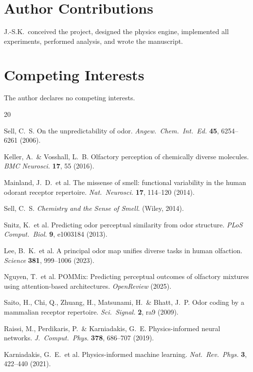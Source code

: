 \documentclass[11pt,a4paper]{article}
\begin{document}
\section*{Author Contributions}
J.-S.K.\ conceived the project, designed the physics engine, implemented all experiments, performed analysis, and wrote the manuscript.

\section*{Competing Interests}
The author declares no competing interests.

\begin{thebibliography}{20}

 Sell, C.\ S. On the unpredictability of odor. \emph{Angew.\ Chem.\ Int.\ Ed.} \textbf{45}, 6254--6261 (2006).

 Keller, A.\ \& Vosshall, L.\ B. Olfactory perception of chemically diverse molecules. \emph{BMC Neurosci.} \textbf{17}, 55 (2016).

 Mainland, J.\ D.\ et al. The missense of smell: functional variability in the human odorant receptor repertoire. \emph{Nat.\ Neurosci.} \textbf{17}, 114--120 (2014).

 Sell, C.\ S. \emph{Chemistry and the Sense of Smell}. (Wiley, 2014).

 Snitz, K.\ et al. Predicting odor perceptual similarity from odor structure. \emph{PLoS Comput.\ Biol.} \textbf{9}, e1003184 (2013).

 Lee, B.\ K.\ et al. A principal odor map unifies diverse tasks in human olfaction. \emph{Science} \textbf{381}, 999--1006 (2023).

 Nguyen, T.\ et al. POMMix: Predicting perceptual outcomes of olfactory mixtures using attention-based architectures. \emph{OpenReview} (2025).

 Saito, H., Chi, Q., Zhuang, H., Matsunami, H.\ \& Bhatt, J.\ P. Odor coding by a mammalian receptor repertoire. \emph{Sci.\ Signal.} \textbf{2}, ra9 (2009).

 Raissi, M., Perdikaris, P.\ \& Karniadakis, G.\ E. Physics-informed neural networks. \emph{J.\ Comput.\ Phys.} \textbf{378}, 686--707 (2019).

 Karniadakis, G.\ E.\ et al. Physics-informed machine learning. \emph{Nat.\ Rev.\ Phys.} \textbf{3}, 422--440 (2021).


\end{thebibliography}
\end{document}
